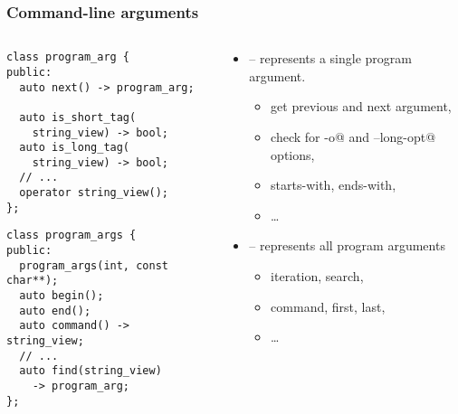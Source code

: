 \documentclass[compress,table,xcolor=table]{beamer}
\begin{document}
\begin{frame}[fragile]
  \frametitle{Command-line arguments}
  \begin{columns}
    \begin{column}{.57\textwidth}
      \begin{lstlisting}[language=c++2x,basicstyle=\scriptsize\ttfamily]
class program_arg {
public:
  auto next() -> program_arg;

  auto is_short_tag(
    string_view) -> bool;
  auto is_long_tag(
    string_view) -> bool;
  // ...
  operator string_view();
};
      \end{lstlisting}
      \vfill
      \begin{lstlisting}[language=c++2x,basicstyle=\scriptsize\ttfamily]
class program_args {
public:
  program_args(int, const char**);
  auto begin();
  auto end();
  auto command() -> string_view;
  // ...
  auto find(string_view)
    -> program_arg;
};
      \end{lstlisting}
    \end{column}
    \begin{column}{.44\textwidth}
      \small
      \begin{itemize}
        \item {} -- represents a single program argument.
        \begin{itemize}
          \smaller
          \item get previous and next argument,
          \item check for \verb@-o@ and \verb@--long-opt@ options,
          \item starts-with, ends-with,
          \item \ldots
        \end{itemize}
        \item {} -- represents all program arguments
        \begin{itemize}
          \smaller
          \item iteration, search,
          \item command, first, last,
          \item \ldots
        \end{itemize}
      \end{itemize}
    \end{column}
  \end{columns}
\end{frame}
\end{document}

